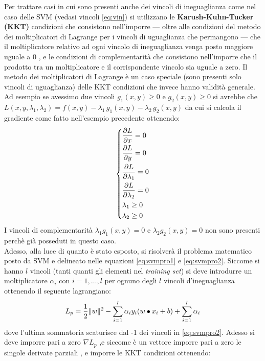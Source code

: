 Per trattare casi in cui sono presenti anche dei vincoli di ineguaglianza come nel caso delle \ac{SVM} (vedasi vincoli \eqref{eq:vin}) si utilizzano le \textbf{Karush-Kuhn-Tucker (KKT)} condizioni che consistono nell'imporre --- oltre alle condizioni del metodo dei moltiplicatori di Lagrange per i vincoli di uguaglianza che permangono --- che il moltiplicatore relativo ad ogni vincolo di ineguaglianza venga posto maggiore uguale a 0 , e le condizioni di complementarità che consistono nell'imporre che il prodotto tra un moltiplicatore e il corrispondente vincolo sia uguale a zero. Il metodo dei moltiplicatori di Lagrange  è un caso speciale (sono presenti solo vincoli di uguaglianza) delle KKT condizioni che invece hanno validità generale.
Ad esempio se avessimo due vincoli $g_{1}(x,y) \geq 0 \text{ e } g_{2}(x,y) \geq 0$ si avrebbe che $L(x,y,\lambda_{1},\lambda_{2}) = f(x,y) - \lambda_{1}\,g_{1}(x,y) - \lambda_{2}\,g_{2}(x,y)$ da cui si calcola il gradiente come fatto nell'esempio precedente ottenendo:
\[
\begin{dcases}
\frac{\partial L}{\partial x} = 0 \\
\frac{\partial L}{\partial y} = 0 \\
\frac{\partial L}{\partial \lambda_{1}} = 0 \\
\frac{\partial L}{\partial \lambda_{2}} = 0 \\
\lambda_{1} \geq 0 \\
\lambda_{2} \geq 0
\end{dcases}
\]
I vincoli di complementarità $\lambda_{1}g_{1}(x,y) = 0$ e $\lambda_{2}g_{2}(x,y) = 0$ non sono presenti perchè già posseduti in questo caso.\\
Adesso, alla luce di quanto è stato esposto, si risolverà il problema matematico posto da \ac{SVM} e delineato nelle equazioni \eqref{eq:svmpro1} e \eqref{eq:svmpro2}. Siccome si hanno $l$ vincoli (tanti quanti gli elementi nel \textit{training set}) si deve introdurre un moltiplicatore $\alpha_{i} \text{ con } i=1,\dots,l$ per ognuno degli $l$ vincoli d'ineguaglianza ottenendo il seguente lagrangiano:
\begin{equation}
\label{eq:pri}
L_{p} = \frac{1}{2}\lVert w\rVert^{2} - \sum_{i=1}^{l}\alpha_{i}y_{i}(w \bullet x_{i} + b) + \sum_{i=1}^{l}\alpha_{i}
\end{equation}
dove l'ultima sommatoria scaturisce dal -1 dei vincoli in \eqref{eq:svmpro2}.
Adesso si deve imporre pari a zero $\nabla L_{p}$ ,e siccome è un vettore imporre pari a zero le singole derivate parziali , e imporre le KKT condizioni ottenendo:

